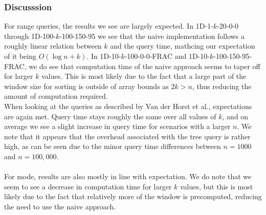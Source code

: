 \documentclass{article}
\begin{document}
\subsubsection*{Discusssion}
For range queries, the results we see are largely expected. In 1D-1-$k$-20-0-0 through 1D-100-$k$-100-150-95 we see that the naive implementation follows a roughly linear relation between $k$ and the query time, mathcing our expectation of it being $O(\log n + k)$. In 1D-10-$k$-100-0-0-FRAC and 1D-10-$k$-100-150-95-FRAC, we do see that computation time of the naive approach seems to taper off for larger $k$ values. This is most likely due to the fact that a large part of the window size for sorting is outside of array bounds as $2k > n$, thus reducing the amount of computation required. \\
When looking at the queries as described by Van der Horst et al., expectations are again met. Query time stays roughly the same over all values of $k$, and on average we see a slight increase in query time for scenarios with a larger $n$. We note that it appears that the overhead associated with the tree query is rather high, as can be seen due to the minor query time differences between $n=1000$ and $n=100,000$. \\\\
For mode, results are also mostly in line with expectation. We do note that we seem to see a decrease in computation time for larger $k$ values, but this is most likely due to the fact that relatively more of the window is precomputed, reducing the need to use the naive approach.
\end{document}
